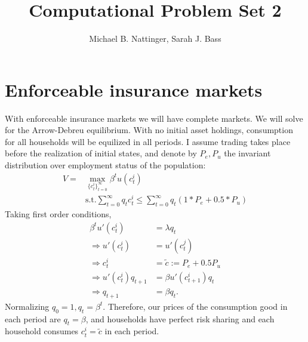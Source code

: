 \documentclass[11pt]{article} %
\title{Computational Problem Set 2}
\author{Michael B. Nattinger, Sarah J. Bass}
\begin{document}
\maketitle

\section{Enforceable insurance markets}
With enforceable insurance markets we will have complete markets. We will solve for the Arrow-Debreu equilibrium. With no initial asset holdings, consumption for all households will be equilized in all periods. I assume trading takes place before the realization of initial states, and denote by $P_e,P_u$ the invariant distribution over employment status of the population:
\begin{align*}
V = &\max_{\{c_t^i\}_{t=0}^{\infty}} \beta^t u(c_t^i) \\
&\text{s.t.} \sum_{t=0}^{\infty} q_t c_t^i \leq \sum_{t=0}^{\infty}q_t(1*P_{e} + 0.5*P_{u})
\end{align*}
Taking first order conditions,
\begin{align*}
\beta^t u'(c_t^i) &= \lambda q_t \\
\Rightarrow u'(c_t^i) &= u'(c_t^j)\\
\Rightarrow c_t^i &= \tilde{c} := P_e + 0.5P_u \\
\Rightarrow u'(c_t^i) q_{t+1} &= \beta u'(c_{t+1}^i) q_{t} \\
\Rightarrow q_{t+1} &= \beta q_t.
\end{align*}
Normalizing $q_0 = 1, q_t = \beta^t$. Therefore, our prices of the consumption good in each period are $q_t = \beta$, and households have perfect risk sharing and each household consumes $c_t^i = \tilde{c}$ in each period.
\end{document}
